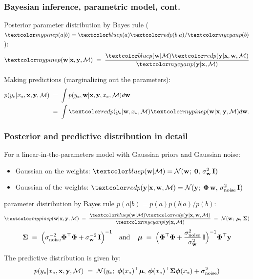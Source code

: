 \begin{frame}
\frametitle{Bayesian inference, parametric model, cont.}

Posterior parameter distribution by Bayes rule ({\small $\Green{p(a|b)}=\Blue{p(a)} \Red{p(b|a)}/\Cyan{p(b)}$}):
\[
\Green{p({\bf w}|{\bf x},{\bf y},\mathcal{M})}\;=\;\frac{\Blue{p({\bf w}|\mathcal{M})}
\Red{p({\bf y}|{\bf x},{\bf w},\mathcal{M})}}{\Cyan{p({\bf y}|{\bf x},\mathcal{M})}}
\]

Making predictions (marginalizing out the parameters):
\[
\begin{split}
p(y_*|x_*,{\bf x}, {\bf y},\mathcal{M})\;&=\;
\int p(y_*,{\bf w}|{\bf x}, {\bf y}, x_*, \mathcal{M})d{\bf w}\\
&=\;\int \Red{p(y_*|{\bf w},x_*,\mathcal{M})}\Green{p({\bf w}|{\bf x}, {\bf y},\mathcal{M})}d{\bf w}.
\end{split}
\]

\end{frame}


\begin{frame}
\frametitle{Posterior and predictive distribution in detail}

For a linear-in-the-parameters model with Gaussian priors and Gaussian noise:
\begin{itemize}
\item Gaussian  on the weights: 
$\Blue{p(\bfw|\mathcal{M})}=\N(\bfw;\;\mathbf{0},\,\sigma_\bfw^2\,\bfI)$
\item Gaussian  of the weights:
$\Red{p(\bfy|\bfx,\bfw,\mathcal{M}})=\N(\bfy;\;\bPhi\,\bfw,\,\sigma_\mathrm{noise}^2\,\bfI)$
\end{itemize}

 parameter distribution by Bayes rule $p(a|b)=p(a)p(b|a)/p(b)$:
\[
\Green{p({\bf w}|{\bf x},{\bf y},\mathcal{M})}\;=\;\frac{\Blue{p({\bf w}|\mathcal{M})}
\Red{p({\bf y}|{\bf x},{\bf w},\mathcal{M})}}{\Cyan{p({\bf y}|{\bf x},\mathcal{M})}}
\;=\; \N(\bfw;\;\bmu,\,\bSigma)
\]
\[
\boldsymbol{\Sigma}\;=\;\left(\sigma_\mathrm{noise}^{-2}\boldsymbol{\Phi}^\top\boldsymbol{\Phi}+\sigma_\mathbf w^{-2}\,\mathbf I\right)^{-1}
\mathrm{\; \; \; and \; \; \; \; }
{\boldsymbol{\mu}}\;=\;
\Big(\boldsymbol{\Phi}^\top\boldsymbol{\Phi}+\frac{\sigma_\mathrm{noise}^2}{\sigma_\mathbf w^2}\,\mathbf I\Big)^{-1}\boldsymbol{\Phi}^\top\mathbf y
\]

The predictive distribution is given by:
\[
p(y_*|x_*,{\bf x}, {\bf y},\mathcal{M})\;=\;
\mathcal{N}(y_*;\; \boldsymbol{\phi}(x_*)^\top{\boldsymbol{\mu}},\,\boldsymbol{\phi}(x_*)^\top\boldsymbol{\Sigma}\boldsymbol{\phi}(x_*)+\sigma_\mathrm{noise}^2)
\]

\end{frame}


